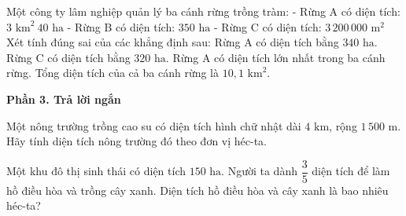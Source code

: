 \begin{ex} %
Một công ty lâm nghiệp quản lý ba cánh rừng trồng tràm:
- Rừng A có diện tích: $3\text{ km}^2\ 40\text{ ha}$
- Rừng B có diện tích: $350\text{ ha}$
- Rừng C có diện tích: $3\,200\,000\text{ m}^2$
Xét tính đúng sai của các khẳng định sau:
\choiceTF
{\True Rừng A có diện tích bằng $340\text{ ha}$.}
{\True Rừng C có diện tích bằng $320\text{ ha}$.}
{Rừng A có diện tích lớn nhất trong ba cánh rừng.}
{\True Tổng diện tích của cả ba cánh rừng là $10{,}1\text{ km}^2$.}
\end{ex}

\textbf{Phần 3. Trả lời ngắn}

\begin{ex} %
Một nông trường trồng cao su có diện tích hình chữ nhật dài $4\text{ km}$, rộng $1\,500\text{ m}$. Hãy tính diện tích nông trường đó theo đơn vị héc-ta.
\end{ex}

\begin{ex} %
Một khu đô thị sinh thái có diện tích $150\text{ ha}$. Người ta dành $\dfrac{3}{5}$ diện tích để làm hồ điều hòa và trồng cây xanh. Diện tích hồ điều hòa và cây xanh là bao nhiêu héc-ta?
\end{ex}

